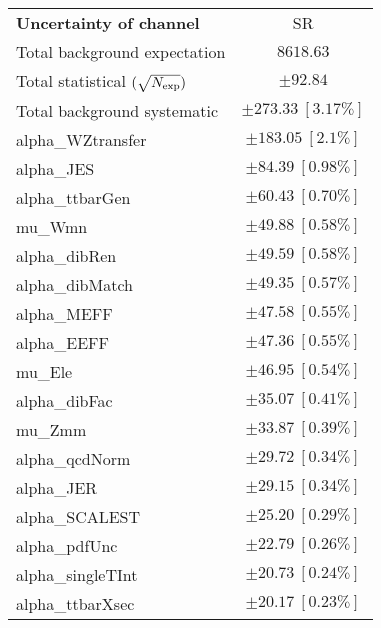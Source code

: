 
\begin{table}
\begin{center}
\setlength{\tabcolsep}{0.0pc}
\begin{tabular*}{\textwidth}{@{\extracolsep{\fill}}lc}
\noalign{\smallskip}\hline\noalign{\smallskip}
{\bf Uncertainty of channel}                                    & SR            \\
\noalign{\smallskip}\hline\noalign{\smallskip}
Total background expectation             &  $8618.63$       \\
\noalign{\smallskip}\hline\noalign{\smallskip}
Total statistical $(\sqrt{N_{\rm exp}})$              & $\pm 92.84$       \\
Total background systematic               & $\pm 273.33\ [3.17\%] $             \\
\noalign{\smallskip}\hline\noalign{\smallskip}
\noalign{\smallskip}\hline\noalign{\smallskip}
alpha\_WZtransfer         & $\pm 183.05\ [2.1\%] $       \\
alpha\_JES         & $\pm 84.39\ [0.98\%] $       \\
alpha\_ttbarGen         & $\pm 60.43\ [0.70\%] $       \\
mu\_Wmn         & $\pm 49.88\ [0.58\%] $       \\
alpha\_dibRen         & $\pm 49.59\ [0.58\%] $       \\
alpha\_dibMatch         & $\pm 49.35\ [0.57\%] $       \\
alpha\_MEFF         & $\pm 47.58\ [0.55\%] $       \\
alpha\_EEFF         & $\pm 47.36\ [0.55\%] $       \\
mu\_Ele         & $\pm 46.95\ [0.54\%] $       \\
alpha\_dibFac         & $\pm 35.07\ [0.41\%] $       \\
mu\_Zmm         & $\pm 33.87\ [0.39\%] $       \\
alpha\_qcdNorm         & $\pm 29.72\ [0.34\%] $       \\
alpha\_JER         & $\pm 29.15\ [0.34\%] $       \\
alpha\_SCALEST         & $\pm 25.20\ [0.29\%] $       \\
alpha\_pdfUnc         & $\pm 22.79\ [0.26\%] $       \\
alpha\_singleTInt         & $\pm 20.73\ [0.24\%] $       \\
alpha\_ttbarXsec         & $\pm 20.17\ [0.23\%] $       \\

\end{tabular*}
\end{center}
\end{table}
